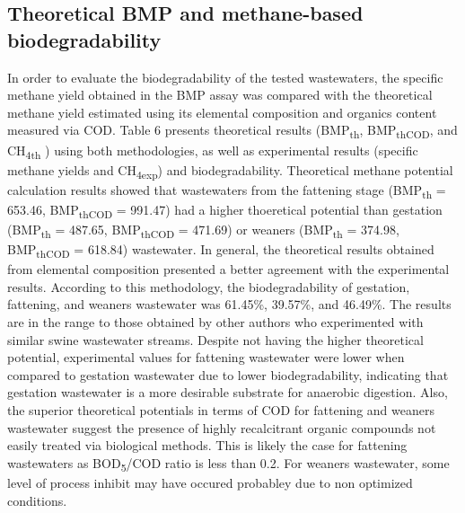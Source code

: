 \subsection{Theoretical BMP and methane-based biodegradability}
In order to evaluate the biodegradability of the tested wastewaters, the specific methane yield obtained in the BMP assay was compared with the theoretical methane yield estimated using its elemental composition and organics content measured via COD. Table 6 presents theoretical results (BMP\textsubscript{th}, BMP\textsubscript{thCOD}, and CH\textsubscript{4th} ) using both methodologies, as well as experimental results (specific methane yields and CH\textsubscript{4exp}) and  biodegradability.  Theoretical methane potential calculation results showed that wastewaters from the fattening stage (BMP\textsubscript{th} = 653.46, BMP\textsubscript{thCOD} = 991.47) had a higher thoeretical potential than gestation (BMP\textsubscript{th} = 487.65, BMP\textsubscript{thCOD} = 471.69) or weaners (BMP\textsubscript{th} = 374.98, BMP\textsubscript{thCOD} = 618.84) wastewater. In general, the theoretical results obtained from elemental composition presented a better agreement with the experimental results. According to this methodology, the biodegradability of gestation, fattening, and weaners wastewater was 61.45\%, 39.57\%, and 46.49\%. The results are in the range to those obtained by other authors \cite{Zhang_2014} who experimented with similar swine wastewater streams. Despite not having the higher theoretical potential, experimental values for fattening wastewater were lower when compared to gestation wastewater due to lower biodegradability, indicating that gestation wastewater is a more desirable substrate for anaerobic digestion. Also, the superior theoretical potentials in terms of COD for fattening and weaners wastewater suggest the presence of highly recalcitrant organic compounds not easily treated via biological methods. This is likely the case for fattening wastewaters as BOD\textsubscript{5}/COD ratio is less than 0.2. For weaners wastewater, some level of process inhibit may have occured probabley due to non optimized conditions. 